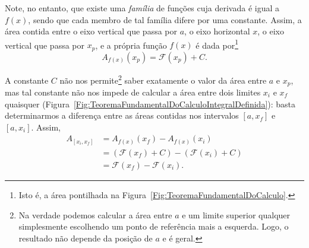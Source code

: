 \noindent{}Note, no entanto, que existe uma \emph{família} de funções cuja derivada é igual a $f(x)$, sendo que cada membro de tal família difere por uma constante. Assim, a área contida entre o eixo vertical que passa por $a$, o eixo horizontal $x$, o eixo vertical que passa por $x_p$, e a própria função $f(x)$ é dada por\footnote[][-2cm]{Isto é, a área pontilhada na Figura~\ref{Fig:TeoremaFundamentalDoCalculo}.}
\begin{equation}
    A_{f(x)}(x_p) = \mathcal{F}(x_p) + C.
\end{equation}
 
A constante $C$ não nos permite\footnote[][-2cm]{Na verdade podemos calcular a área entre $a$ e um limite superior qualquer simplesmente escolhendo um ponto de referência mais a esquerda. Logo, o resultado  não depende da posição de $a$ e é geral.} saber exatamente o valor da área entre $a$ e $x_p$, mas tal constante não nos impede de calcular a área entre dois limites $x_i$ e $x_f$ quaisquer (Figura~\ref{Fig:TeoremaFundamentalDoCalculoIntegralDefinida}): basta determinarmos a diferença entre as áreas contidas nos intervalos $[a,x_f]$ e $[a,x_i]$. Assim,
\begin{align}
    A_{[x_i,x_f]} &= A_{f(x)}(x_f) - A_{f(x)}(x_i) \\
    &= (\mathcal{F}(x_f) + C) - (\mathcal{F}(x_i) + C) \\
    &= \mathcal{F}(x_f) - \mathcal{F}(x_i).
\end{align}

